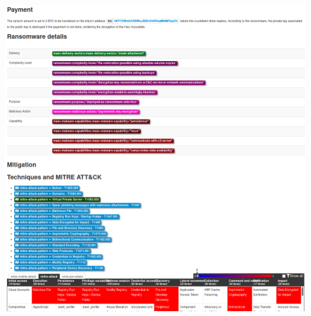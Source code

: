 \begin{frame}
    \vspace{-5pt}
    \begin{center}
        \includegraphics[width=0.63\linewidth]{pictures/case2/event-report-3.png}
    \end{center}
\end{frame}

